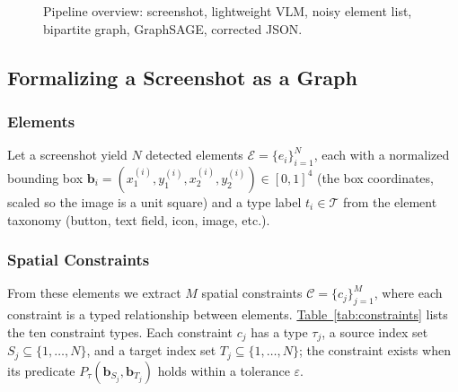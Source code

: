 \documentclass[11pt, letterpaper]{article}
\begin{document}
\begin{figure}[htbp]
\centering
{}
\caption{Pipeline overview: screenshot, lightweight VLM, noisy element
list, bipartite graph, GraphSAGE, corrected JSON.}
\label{fig:pipeline}
\end{figure}

\subsection{Formalizing a Screenshot as a Graph}
\subsubsection{Elements}
\sloppy
Let a screenshot yield $N$ detected elements
$\mathcal{E}=\{e_i\}_{i=1}^{N}$, each with a normalized bounding box
$\mathbf{b}_i=(x_1^{(i)},y_1^{(i)},x_2^{(i)},y_2^{(i)})\in[0,1]^4$ (the box
coordinates, scaled so the image is a unit square) and a type label
$t_i\in\mathcal{T}$ from the element taxonomy (button, text field, icon,
image, etc.).

\subsubsection{Spatial Constraints}
From these elements we extract $M$ spatial constraints
$\mathcal{C}=\{c_j\}_{j=1}^{M}$, where each constraint is a typed relationship
between elements. \hyperref[tab:constraints]{Table~\ref{tab:constraints}} lists the ten constraint types.
Each constraint $c_j$ has a type $\tau_j$, a source index set
$S_j\subseteq\{1,\dots,N\}$, and a target index set
$T_j\subseteq\{1,\dots,N\}$; the constraint exists when its predicate
$P_\tau(\mathbf{b}_{S_j},\mathbf{b}_{T_j})$ holds within a tolerance
$\varepsilon$.
\end{document}

